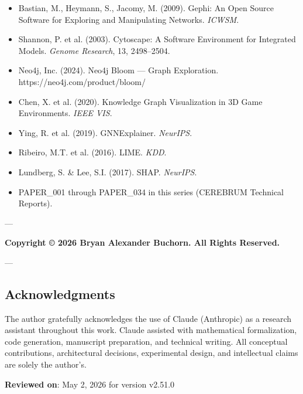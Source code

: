 \begin{itemize}
\item [gephi2009] Bastian, M., Heymann, S., Jacomy, M. (2009). Gephi: An Open Source Software for Exploring and Manipu\-lating Networks. \textit{ICWSM}.
\item [cytoscape\-2003\-] Shannon, P. et al. (2003). Cytoscape: A Software Environment for Integrated Models. \textit{Genome Research}, 13, 2498–2504.
\item [neo4j2024bloom] Neo4j, Inc. (2024). Neo4j Bloom — Graph Exploration. https://neo4j.com/product/bloom/
\item [chen\-2020\-kg3d] Chen, X. et al. (2020). Knowledge Graph Visual\-ization in 3D Game Enviro\-nments. \textit{IEEE VIS}.
\item [ying\-2019\-gnnex\-plainer] Ying, R. et al. (2019). GNNExplainer. \textit{NeurIPS}.
\item [ribeiro\-2016\-lime] Ribeiro, M.T. et al. (2016). LIME. \textit{KDD}.
\item [lundberg\-2017\-shap] Lundberg, S. \& Lee, S.I. (2017). SHAP. \textit{NeurIPS}.
\item PAPER\_001 through PAPER\_034 in this series (CEREBRUM Technical Reports).

\end{itemize}
---

\textbf{Copyright © 2026 Bryan Alexander Buchorn. All Rights Reserved.}

---
\subsection{Acknow\-ledgments}

The author gratefully ackno\-wledges the use of Claude (Anthropic) as a research assistant throughout this work. Claude assisted with mathe\-matical forma\-lization, code generation, manuscript preparation, and technical writing. All conceptual contr\-ibutions, archi\-tectural decisions, exper\-imental design, and intel\-lectual claims are solely the author's.

\textbf{Reviewed on}: May 2, 2026 for version v2.51.0

